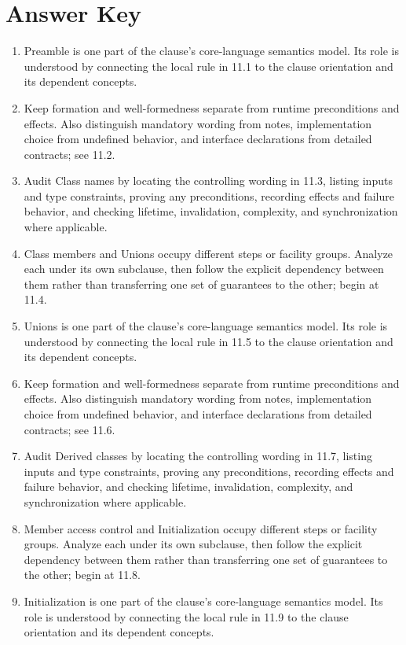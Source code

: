 \documentclass[11pt,letterpaper]{article}
\begin{document}
\clearpage\section{Answer Key}
\begin{enumerate}
\item Preamble is one part of the clause's core-language semantics model. Its role is understood by connecting the local rule in 11.1 to the clause orientation and its dependent concepts.
\item Keep formation and well-formedness separate from runtime preconditions and effects. Also distinguish mandatory wording from notes, implementation choice from undefined behavior, and interface declarations from detailed contracts; see 11.2.
\item Audit Class names by locating the controlling wording in 11.3, listing inputs and type constraints, proving any preconditions, recording effects and failure behavior, and checking lifetime, invalidation, complexity, and synchronization where applicable.
\item Class members and Unions occupy different steps or facility groups. Analyze each under its own subclause, then follow the explicit dependency between them rather than transferring one set of guarantees to the other; begin at 11.4.
\item Unions is one part of the clause's core-language semantics model. Its role is understood by connecting the local rule in 11.5 to the clause orientation and its dependent concepts.
\item Keep formation and well-formedness separate from runtime preconditions and effects. Also distinguish mandatory wording from notes, implementation choice from undefined behavior, and interface declarations from detailed contracts; see 11.6.
\item Audit Derived classes by locating the controlling wording in 11.7, listing inputs and type constraints, proving any preconditions, recording effects and failure behavior, and checking lifetime, invalidation, complexity, and synchronization where applicable.
\item Member access control and Initialization occupy different steps or facility groups. Analyze each under its own subclause, then follow the explicit dependency between them rather than transferring one set of guarantees to the other; begin at 11.8.
\item Initialization is one part of the clause's core-language semantics model. Its role is understood by connecting the local rule in 11.9 to the clause orientation and its dependent concepts.

\end{enumerate}
\end{document}
